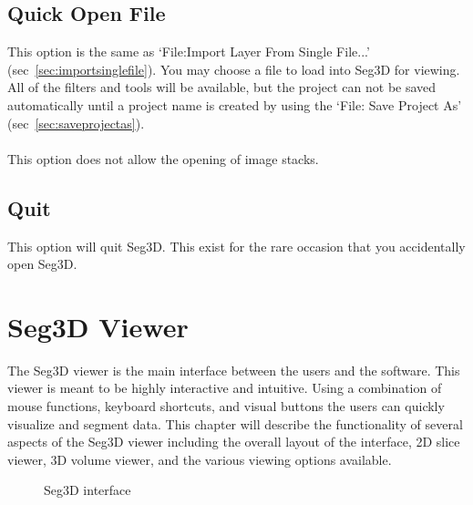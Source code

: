 \documentclass[fleqn,11pt,openany]{book}
\begin{document}
\section{Quick Open File}

This option is the same as `File:Import Layer From Single File...' (sec~\ref{sec:importsinglefile}).  You may choose a file to load into Seg3D for viewing.  All of the filters and tools will be available, but the project can not be saved automatically until a project name is created by using the `File: Save Project As' (sec~\ref{sec:saveprojectas}). 
\\
\\
This option does not allow the opening of image stacks.

\section{Quit}

This option will quit Seg3D.  This exist for the rare occasion that you accidentally open Seg3D.  



\chapter{Seg3D Viewer}
\label{sec:viewer}

\begin{introduction}
The Seg3D viewer is the main interface between the users and the software.  This viewer is meant to be highly interactive and intuitive.  Using a combination of mouse functions, keyboard shortcuts, and visual buttons the users can quickly visualize and segment data.  This chapter will describe the functionality of several aspects of the Seg3D viewer including the overall layout of the interface, 2D slice viewer, 3D volume viewer, and the various viewing options available.
\end{introduction}



\begin{figure}[h!]
\caption{Seg3D interface}\label{fig:blank}
\end{figure}
\end{document}
